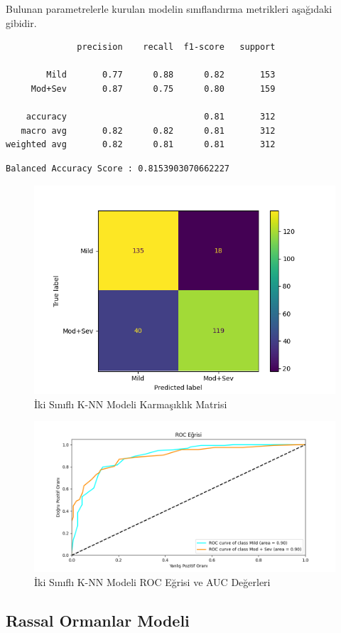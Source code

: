 \documentclass[12pt,twoside]{deuthesis}
\begin{document}
Bulunan parametrelerle kurulan modelin sınıflandırma metrikleri aşağıdaki gibidir.
\begin{verbatim}
              precision    recall  f1-score   support

        Mild       0.77      0.88      0.82       153
     Mod+Sev       0.87      0.75      0.80       159

    accuracy                           0.81       312
   macro avg       0.82      0.82      0.81       312
weighted avg       0.82      0.81      0.81       312
\end{verbatim}
\begin{verbatim}
Balanced Accuracy Score : 0.8153903070662227
\end{verbatim}
\begin{figure}

{\centering \includegraphics[width=1.05\linewidth,height=0.6\textheight]{figure/knn_bin_conf} 

}

\caption{İki Sınıflı K-NN Modeli Karmaşıklık Matrisi}\label{fig:unnamed-chunk-57}
\end{figure}
\begin{figure}

{\centering \includegraphics[width=1.05\linewidth,height=0.6\textheight]{figure/KNeighborsClassifier_binary_roc} 

}

\caption{İki Sınıflı K-NN Modeli ROC Eğrisi ve AUC Değerleri}\label{fig:unnamed-chunk-58}
\end{figure}
\hypertarget{bin_rf}{%
\subsection{Rassal Ormanlar Modeli}\label{bin_rf}}
\end{document}
